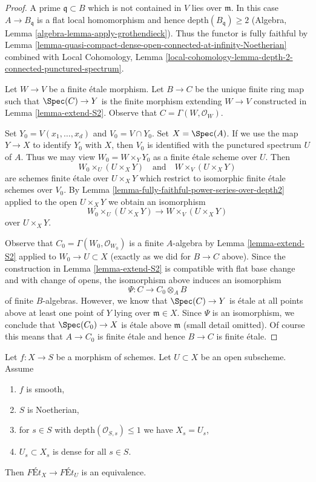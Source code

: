 \begin{proof}
A prime $\mathfrak q \subset B$ which is not contained in $V$
lies over $\mathfrak m$. In this case $A \to B_\mathfrak q$
is a flat local homomorphism and hence $\text{depth}(B_\mathfrak q) \geq 2$
(Algebra, Lemma \ref{algebra-lemma-apply-grothendieck}).
Thus the functor is fully faithful by
Lemma \ref{lemma-quasi-compact-dense-open-connected-at-infinity-Noetherian}
combined with Local Cohomology,
Lemma \ref{local-cohomology-lemma-depth-2-connected-punctured-spectrum}.

\medskip\noindent
Let $W \to V$ be a finite \'etale morphism. Let $B \to C$ be the unique finite
ring map such that $\Spec(C) \to Y$ is the finite morphism extending
$W \to V$ constructed in Lemma \ref{lemma-extend-S2}.
Observe that $C = \Gamma(W, \mathcal{O}_W)$.

\medskip\noindent
Set $Y_0 = V(x_1, \ldots, x_d)$ and $V_0 = V \cap Y_0$. Set $X = \Spec(A)$.
If we use the map $Y \to X$ to identify $Y_0$ with $X$,
then $V_0$ is identified with the punctured spectrum $U$ of $A$.
Thus we may view $W_0 = W \times_Y Y_0$ as a finite \'etale scheme
over $U$. Then
$$
W_0 \times_U (U \times_X Y)
\quad\text{and}\quad
W \times_V (U \times_X Y)
$$
are schemes finite \'etale over $U \times_X Y$ which restrict to
isomorphic finite \'etale schemes over $V_0$. By
Lemma \ref{lemma-fully-faithful-power-series-over-depth2}
applied to the open $U \times_X Y$ we obtain an isomorphism
$$
W_0 \times_U (U \times_X Y) \longrightarrow W \times_V (U \times_X Y)
$$
over $U \times_X Y$.

\medskip\noindent
Observe that $C_0 = \Gamma(W_0, \mathcal{O}_{W_0})$ is a finite $A$-algebra
by Lemma \ref{lemma-extend-S2} applied to $W_0 \to U \subset X$ (exactly
as we did for $B \to C$ above). Since the construction in
Lemma \ref{lemma-extend-S2} is compatible with flat base change
and with change of opens, the isomorphism above induces
an isomorphism
$$
\Psi : C \longrightarrow C_0 \otimes_A B
$$
of finite $B$-algebras. However, we know that $\Spec(C) \to Y$
is \'etale at all points above at least one point of $Y$ lying
over $\mathfrak m \in X$. Since $\Psi$ is an isomorphism, we
conclude that $\Spec(C_0) \to X$
is \'etale above $\mathfrak m$ (small detail omitted).
Of course this means that $A \to C_0$ is finite
\'etale and hence $B \to C$ is finite \'etale.
\end{proof}

\begin{lemma}
\label{lemma-purity-smooth-over-depth2}
Let $f : X \to S$ be a morphism of schemes. Let $U \subset X$
be an open subscheme. Assume
\begin{enumerate}
\item $f$ is smooth,
\item $S$ is Noetherian,
\item for $s \in S$ with $\text{depth}(\mathcal{O}_{S, s}) \leq 1$
we have $X_s = U_s$,
\item $U_s \subset X_s$ is dense for all $s \in S$.
\end{enumerate}
Then $\textit{F\'Et}_X \to \textit{F\'Et}_U$ is an equivalence.
\end{lemma}

